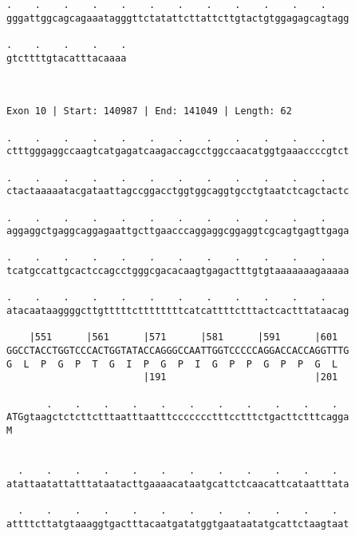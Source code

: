 \documentclass{article}
\begin{document}
\begin{Verbatim}
.    .    .    .    .    .    .    .    .    .    .    .    
gggattggcagcagaaatagggttctatattcttattcttgtactgtggagagcagtagg
                                                            
.    .    .    .    .
gtcttttgtacatttacaaaa
                     
                     
 
Exon 10 | Start: 140987 | End: 141049 | Length: 62
 
.    .    .    .    .    .    .    .    .    .    .    .    
ctttgggaggccaagtcatgagatcaagaccagcctggccaacatggtgaaaccccgtct
                                                            
.    .    .    .    .    .    .    .    .    .    .    .    
ctactaaaaatacgataattagccggacctggtggcaggtgcctgtaatctcagctactc
                                                            
.    .    .    .    .    .    .    .    .    .    .    .    
aggaggctgaggcaggagaattgcttgaacccaggaggcggaggtcgcagtgagttgaga
                                                            
.    .    .    .    .    .    .    .    .    .    .    .    
tcatgccattgcactccagcctgggcgacacaagtgagactttgtgtaaaaaaagaaaaa
                                                            
.    .    .    .    .    .    .    .    .    .    .    .    
atacaataaggggcttgtttttcttttttttcatcattttctttactcactttataacag
                                                            
    |551      |561      |571      |581      |591      |601  
GGCCTACCTGGTCCCACTGGTATACCAGGGCCAATTGGTCCCCCAGGACCACCAGGTTTG
G  L  P  G  P  T  G  I  P  G  P  I  G  P  P  G  P  P  G  L  
                        |191                          |201  
  
       .    .    .    .    .    .    .    .    .    .    .  
ATGgtaagctctcttctttaatttaatttccccccctttcctttctgacttctttcagga
M                                                           
                                                            
  
  .    .    .    .    .    .    .    .    .    .    .    .  
atattaatattatttataatacttgaaaacataatgcattctcaacattcataatttata
                                                            
  .    .    .    .    .    .    .    .    .    .    .    .  
attttcttatgtaaaggtgactttacaatgatatggtgaataatatgcattctaagtaat
                                                            

\end{Verbatim}
\end{document}
